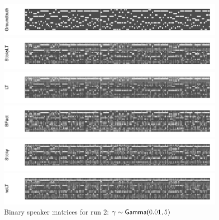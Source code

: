 \begin{figure}[tb]
\begin{center}
  \centerline{\includegraphics[width = \textwidth, height = 0.2\textwidth]{fig/cocktail/synth_s16_m12/hyper_gamma/h10.0_nocs_cp0/a0p01b5/groundtruth.pdf}}
  \centerline{\includegraphics[width = \textwidth, height = 0.2\textwidth]{fig/cocktail/synth_s16_m12/hyper_gamma/h10.0_nocs_cp0/a0p01b5/StickyLT_hdp_hmm_w0_agamma0p01_bgamma5/binary_state.pdf}}
  \centerline{\includegraphics[width = \textwidth, height = 0.2\textwidth]{fig/cocktail/synth_s16_m12/hyper_gamma/h10.0_nocs_cp0/a0p01b5/LT_hdp_hmm_w0_agamma0p01_bgamma5/binary_state.pdf}}
  \centerline{\includegraphics[width = \textwidth, height = 0.2\textwidth]{fig/cocktail/synth_s16_m12/hyper_gamma/h10.0_nocs_cp0/a0p01b5/BFact_hmm_w0_agamma0p01_bgamma5/binary_state.pdf}}
  \centerline{\includegraphics[width = \textwidth, height = 0.2\textwidth]{fig/cocktail/synth_s16_m12/hyper_gamma/h10.0_nocs_cp0/a0p01b5/Sticky_hdp_hmm_w0_agamma0p01_bgamma5/binary_state.pdf}}
  \centerline{\includegraphics[width = \textwidth, height = 0.2\textwidth]{fig/cocktail/synth_s16_m12/hyper_gamma/h10.0_nocs_cp0/a0p01b5/noLT_hdp_hmm_w0_agamma0p01_bgamma5/binary_state.pdf}}
\caption{Binary speaker matrices for run 2: $\gamma \sim \mathsf{Gamma}(0.01,5)$}
\end{center}
\end{figure}

